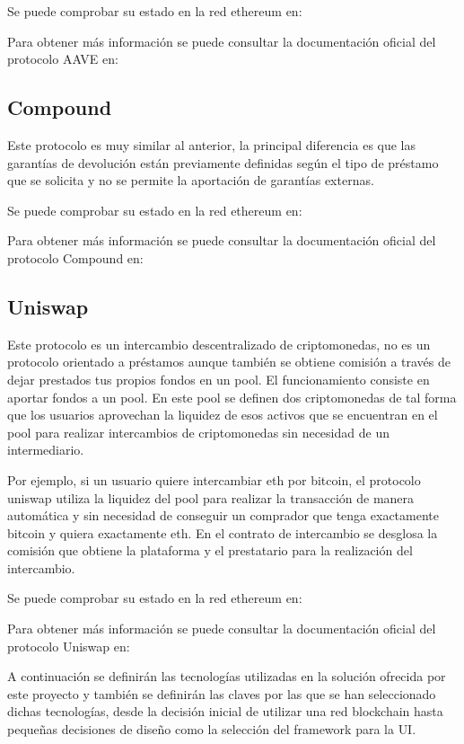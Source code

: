 Se puede comprobar su estado en la red \gls{ethereum} en: \citetitle{[26]}~\cite{[26]}

Para obtener más información se puede consultar la documentación oficial del protocolo AAVE en: \citetitle{[29]}~\cite{[29]}
\subsection{Compound}
Este protocolo es muy similar al anterior, la principal diferencia es que las garantías de devolución
están previamente definidas según el tipo de préstamo que se solicita y no se permite la aportación 
de garantías externas.

Se puede comprobar su estado en la red \gls{ethereum} en: \citetitle{[27]}~\cite{[27]}

Para obtener más información se puede consultar la documentación oficial del protocolo Compound en: \citetitle{[30]}~\cite{[30]}
\subsection{Uniswap}
Este protocolo es un intercambio descentralizado de criptomonedas, no es un protocolo orientado a 
 préstamos aunque también se obtiene comisión a través de dejar prestados tus
propios fondos en un \gls{pool}.
El funcionamiento consiste en aportar fondos a un \gls{pool}. En este \gls{pool} se definen dos criptomonedas
de tal forma que los usuarios aprovechan la liquidez de esos activos que se encuentran en el \gls{pool}
para realizar intercambios de criptomonedas sin necesidad de un intermediario.

Por ejemplo, si un usuario quiere intercambiar \gls{eth} por \gls{bitcoin}, el protocolo \gls{uniswap} 
utiliza la liquidez del \gls{pool} para realizar la transacción de manera automática y sin necesidad
de conseguir un comprador que tenga exactamente \gls{bitcoin} y quiera exactamente \gls{eth}.
En el contrato de intercambio se desglosa la comisión que obtiene la plataforma y el prestatario 
para la realización del intercambio.

Se puede comprobar su estado en la red \gls{ethereum} en: \citetitle{[28]}~\cite{[28]}

Para obtener más información se puede consultar la documentación oficial del protocolo Uniswap en: \citetitle{[31]}~\cite{[31]}


A continuación se definirán las tecnologías utilizadas en la solución ofrecida por este proyecto
y también se definirán las claves por las que se han seleccionado dichas tecnologías,
desde la decisión inicial de utilizar una red blockchain hasta pequeñas decisiones de 
diseño como la selección del \gls{framework} para la \gls{UI}.

